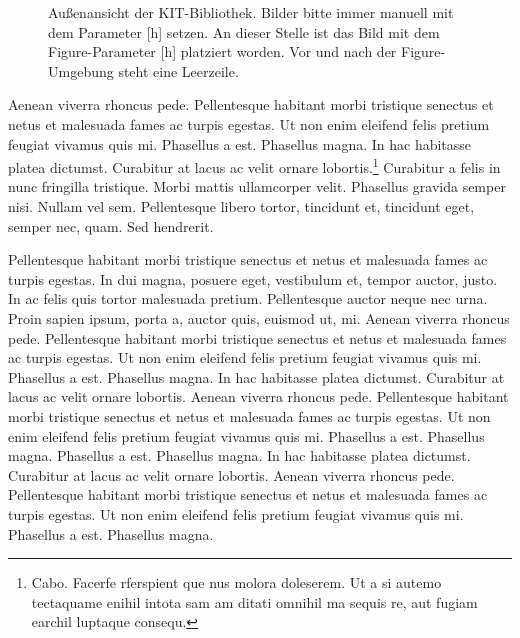 \begin{figure}[h!]
{	}
\hfill %
	\caption{Außenansicht der KIT-Bibliothek. Bilder bitte immer manuell mit dem Parameter [h] setzen.	An dieser Stelle ist das Bild mit dem Figure-Parameter [h] platziert worden. Vor und nach der Figure-Umgebung steht eine Leerzeile.}
	\label{fig:bib4}
\end{figure}

Aenean viverra rhoncus pede. Pellentesque habitant morbi tristique senectus et netus et malesuada fames ac turpis egestas. Ut non enim eleifend felis pretium feugiat vivamus quis mi. Phasellus a est. Phasellus magna. In hac habitasse platea dictumst. Curabitur at lacus ac velit ornare lobortis.\footnote{Cabo. Facerfe rferspient que nus molora doleserem. Ut a si autemo tectaquame enihil intota sam am ditati omnihil ma sequis re, aut fugiam earchil luptaque consequ.} Curabitur a felis in nunc fringilla tristique. Morbi mattis ullamcorper velit. Phasellus gravida semper nisi. Nullam vel sem. Pellentesque libero tortor, tincidunt et, tincidunt eget, semper nec, quam. Sed hendrerit.

Pellentesque habitant morbi tristique senectus et netus et malesuada fames ac turpis egestas. In dui magna, posuere eget, vestibulum et, tempor auctor, justo. In ac felis quis tortor malesuada pretium. Pellentesque auctor neque nec urna. Proin sapien ipsum, porta a, auctor quis, euismod ut, mi. Aenean viverra rhoncus pede. Pellentesque habitant morbi tristique senectus et netus et malesuada fames ac turpis egestas. Ut non enim eleifend felis pretium feugiat vivamus quis mi. Phasellus a est. Phasellus magna. In hac habitasse platea dictumst. Curabitur at lacus ac velit ornare lobortis. Aenean viverra rhoncus pede. Pellentesque habitant morbi tristique senectus et netus et malesuada fames ac turpis egestas. Ut non enim eleifend felis pretium feugiat vivamus quis mi. Phasellus a est. Phasellus magna. Phasellus a est. Phasellus magna. In hac habitasse platea dictumst. Curabitur at lacus ac velit ornare lobortis. Aenean viverra rhoncus pede. Pellentesque habitant morbi tristique senectus et netus et malesuada fames ac turpis egestas. Ut non enim eleifend felis pretium feugiat vivamus quis mi. Phasellus a est. Phasellus magna.

